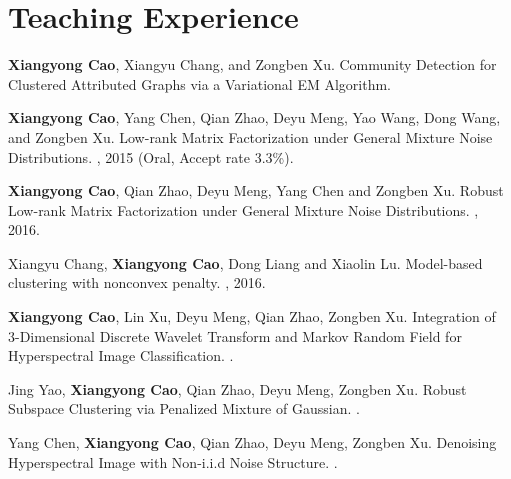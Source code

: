 \documentclass[11pt,a4paper,sans]{moderncv}   %
\begin{document}
\section{Teaching Experience}

\begin{thebibliography}{1}
\textbf{Xiangyong Cao}, Xiangyu Chang, and Zongben Xu.
\newblock \textcolor[rgb]{0.00,0.00,1.00}{ Community Detection for Clustered Attributed Graphs via a Variational EM Algorithm.}

\textbf{Xiangyong Cao}, Yang Chen, Qian Zhao, Deyu Meng, Yao Wang, Dong Wang, and Zongben Xu.
\newblock \textcolor[rgb]{0.00,0.00,1.00}{Low-rank Matrix Factorization under General Mixture Noise Distributions.}
, 2015 (Oral, Accept rate 3.3\%).

\textbf{Xiangyong Cao}, Qian Zhao, Deyu Meng, Yang Chen and Zongben Xu.
\newblock \textcolor[rgb]{0.00,0.00,1.00}{Robust Low-rank Matrix Factorization under General Mixture Noise Distributions.}
, 2016.

Xiangyu Chang, \textbf{Xiangyong Cao}, Dong Liang and Xiaolin Lu.
\newblock \textcolor[rgb]{0.00,0.00,1.00}{ Model-based clustering with nonconvex penalty.}
, 2016.

\textbf{Xiangyong Cao}, Lin Xu, Deyu Meng, Qian Zhao, Zongben Xu.
\newblock \textcolor[rgb]{0.00,0.00,1.00}{Integration of 3-Dimensional Discrete Wavelet Transform and Markov Random Field for Hyperspectral Image Classification.}
.

Jing Yao, \textbf{Xiangyong Cao}, Qian Zhao, Deyu Meng, Zongben Xu.
\newblock \textcolor[rgb]{0.00,0.00,1.00}{Robust Subspace Clustering via Penalized Mixture of Gaussian.}
.

Yang Chen, \textbf{Xiangyong Cao}, Qian Zhao, Deyu Meng,  Zongben Xu.
\newblock \textcolor[rgb]{0.00,0.00,1.00}{Denoising Hyperspectral Image with Non-i.i.d Noise Structure.}
.


\end{thebibliography}
\end{document}
